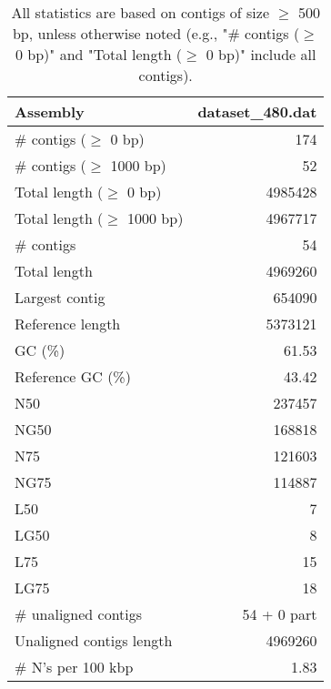 \documentclass[12pt,a4paper]{article}
\begin{document}
\begin{table}[ht]
\begin{center}
\caption{All statistics are based on contigs of size $\geq$ 500 bp, unless otherwise noted (e.g., "\# contigs ($\geq$ 0 bp)" and "Total length ($\geq$ 0 bp)" include all contigs).}
\begin{tabular}{|l*{1}{|r}|}
\hline
Assembly & dataset\_480.dat \\ \hline
\# contigs ($\geq$ 0 bp) & 174 \\ \hline
\# contigs ($\geq$ 1000 bp) & 52 \\ \hline
Total length ($\geq$ 0 bp) & 4985428 \\ \hline
Total length ($\geq$ 1000 bp) & 4967717 \\ \hline
\# contigs & 54 \\ \hline
Total length & 4969260 \\ \hline
Largest contig & 654090 \\ \hline
Reference length & 5373121 \\ \hline
GC (\%) & 61.53 \\ \hline
Reference GC (\%) & 43.42 \\ \hline
N50 & 237457 \\ \hline
NG50 & 168818 \\ \hline
N75 & 121603 \\ \hline
NG75 & 114887 \\ \hline
L50 & 7 \\ \hline
LG50 & 8 \\ \hline
L75 & 15 \\ \hline
LG75 & 18 \\ \hline
\# unaligned contigs & 54 + 0 part \\ \hline
Unaligned contigs length & 4969260 \\ \hline
\# N's per 100 kbp & 1.83 \\ \hline
\end{tabular}
\end{center}
\end{table}
\end{document}
